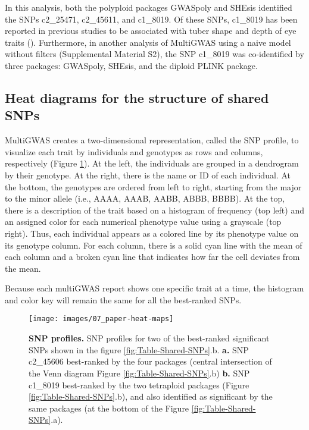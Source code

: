 \documentclass{article}
\begin{document}
In this analysis, both the polyploid packages GWASpoly and SHEsis identified the SNPs c2\_25471, c2\_45611, and c1\_8019. Of these SNPs, c1\_8019 has been reported in previous studies to be associated with tuber shape and depth of eye traits (\cite{Rosyara2016, Sharma2018}). Furthermore, in another analysis of MultiGWAS using a naive model without filters (Supplemental Material S2), the SNP c1\_8019 was co-identified by three packages: GWASpoly, SHEsis, and the diploid PLINK package.

\subsection{Heat diagrams for the structure of shared SNPs}

MultiGWAS creates a two-dimensional representation, called the SNP profile, to visualize each trait by individuals and genotypes as rows and columns, respectively (Figure \ref{fig:SNP-profiles}). At the left, the individuals are grouped in a dendrogram by their genotype. At the right, there is the name or ID of each individual. At the bottom, the genotypes are ordered from left to right, starting from the major to the minor allele (i.e., AAAA, AAAB, AABB, ABBB, BBBB). At the top, there is a description of the trait based on a histogram of frequency (top left) and an assigned color for each numerical phenotype value using a grayscale (top right). Thus, each individual appears as a colored line by its phenotype value on its genotype column. For each column, there is a solid cyan line with the mean of each column and a broken cyan line that indicates how far the cell deviates from the
mean.

Because each multiGWAS report shows one specific trait at a time, the histogram and color key will remain the same for all the best-ranked
SNPs.

\begin{figure}[H]
\begin{centering}
\texttt{[image: images/07\_paper-heat-maps]}
\par\end{centering}
\caption{\textbf{SNP profiles. }{SNP profiles for two of the best-ranked significant SNPs shown in the figure \ref{fig:Table-Shared-SNPs}.b.
\textbf{a.} SNP c2\_45606 best-ranked by the four packages (central intersection of the Venn diagram Figure \ref{fig:Table-Shared-SNPs}.b) \textbf{b.} SNP c1\_8019 best-ranked by the two tetraploid packages (Figure \ref{fig:Table-Shared-SNPs}.b), and also identified as significant by the same packages (at the bottom of the Figure  \ref{fig:Table-Shared-SNPs}.a). \label{fig:SNP-profiles}}}
\end{figure}
\end{document}
